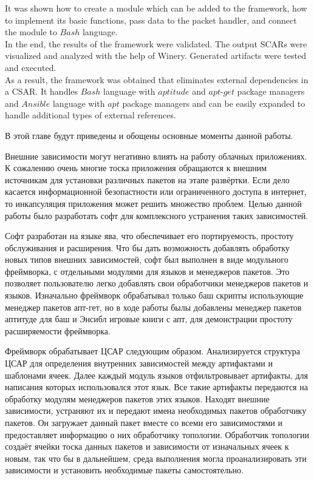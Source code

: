 It  was shown how to create a module which can be added to the framework, how to implement its basic functions, pass data to the packet handler, and connect the module to $Bash$ language. \\
In the end, the results of the framework were validated.
The output SCARs were visualized and analyzed with the help of Winery.
Generated artifacts were tested and executed.\\
As a result, the framework was obtained that eliminates external dependencies in a CSAR.
It handles $Bash$ language with $aptitude$ and $apt$-$get$ package managers and $Ansible$ language with $apt$ package managers and can be easily expanded to handle additional types of external references. 

В этой главе будут приведены и обощены основные моменты данной работы.

Внешние зависимости могут негативно влиять на работу облачных приложениях.
К сожалению очень многие тоска приложения обращаются к внешним источникам для установки различных пакетов на этапе развёртки.
Если дело касается информационной безопастности или ограниченного доступа в интернет, то инкапсуляция приложения может решить множество проблем.
Целью данной работы было разработать софт для комплексного устранения таких зависимостей.

Софт разработан на языке ява, что обеспечивает его портируемость, простоту обслуживания и расширения.
Что бы дать возможность добавлять обработку новых типов внешних зависимостей, софт был выполнен в виде модульного фреймворка, с отдельными модулями для языков и менеджеров пакетов.
Это позволяет пользователю легко добавлять свои обработчики менеджеров пакетов и языков.
Изначально фреймворк обрабатывал только баш скрипты использующие менеджер пакетов апт-гет, но в ходе работы былы добавлены менеджер пакетов аптитуде для баш и Энсибл игровые книги с апт, для демонстрации простоту расширяемости фреймворка. 

Фреймворк обрабатывает ЦСАР следующим образом. 
Анализируется структура ЦСАР для определения внутренних зависимостей между артифактами и шаблонами ячеек.
Далее каждый модуль языков отфильтровывает артифакты, для написания которых использовался этот язык.
Все такие артифакты передаются на обработку модулям менеджеров пакетов этих языков. 
Находят внешние зависимости, устраняют их и передают имена необходимых пакетов обработчику пакетов.
Он загружает данный пакет вместе со всеми его зависимостями и предоставляет информацию о них обработчику топологии.
Обработчик топологии создаёт ячейки тоска данных пакетов и зависимости от изначальных ячеек к новым, так что бы в дальнейшем, среда выполнения могла проанализировать эти зависимости и установить необходимые пакеты самостоятельно.

